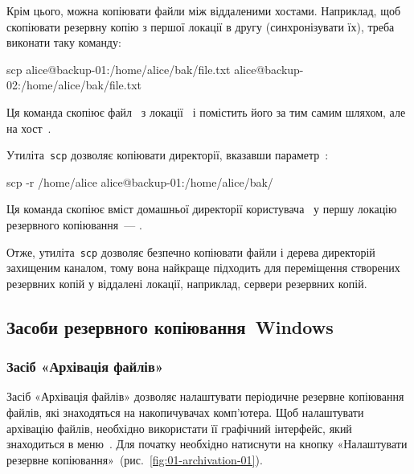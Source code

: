 \documentclass[
	a4paper,
	oneside,
	BCOR = 10mm,
	DIV = 12,
	12pt,
	headings = normal,
]{scrartcl}
\newcommand{\progname}[1]{\texttt{#1}}
\begin{document}
				Крім цього, можна копіювати файли між віддаленими хостами. Наприклад, щоб скопіювати резервну копію з першої локації в другу (синхронізувати їх), треба виконати таку команду:
				\begin{bashterm}
					scp alice@backup-01:/home/alice/bak/file.txt alice@backup-02:/home/alice/bak/file.txt
				\end{bashterm}
				Ця команда скопіює файл~ з локації~ і помістить його за тим самим шляхом, але на хост~.

				Утиліта~\progname{scp} дозволяє копіювати директорії, вказавши параметр~:
				\begin{bashterm}
					scp -r /home/alice alice@backup-01:/home/alice/bak/
				\end{bashterm}
				Ця команда скопіює вміст домашньої директорії користувача~ у першу локацію резервного копіювання~— .

				Отже, утиліта~\progname{scp} дозволяє безпечно копіювати файли і дерева директорій захищеним каналом, тому вона найкраще підходить для переміщення створених резервних копій у віддалені локації, наприклад, сервери резервних копій.

		\subsection{Засоби резервного копіювання~\textenglish{Windows}}
			\subsubsection{Засіб «Архівація файлів»}
				Засіб «Архівація файлів» дозволяє налаштувати періодичне резервне копіювання файлів, які знаходяться на накопичувачах комп'ютера. Щоб налаштувати архівацію файлів, необхідно використати її графічний інтерфейс, який знаходиться в меню~. Для початку необхідно натиснути на кнопку «Налаштувати резервне копіювання»~(рис.~\ref{fig:01-archivation-01}).
\end{document}
